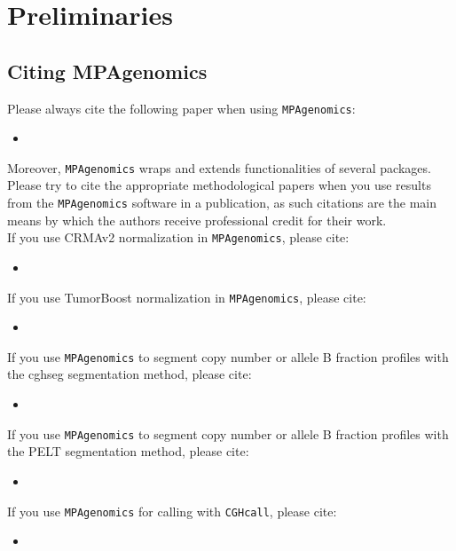 \documentclass[a4paper,10pt]{article}
\begin{document}
\section{Preliminaries}

	\subsection{Citing MPAgenomics}
  
  Please always cite the following paper when using \texttt{MPAgenomics}:
    \begin{itemize}
      \item {}
    \end{itemize}
    
Moreover, \texttt{MPAgenomics} wraps and extends functionalities of several packages. Please try to cite the appropriate methodological papers when you use results from the \texttt{MPAgenomics} software in a publication, as such citations are the main means by which the authors receive professional credit for their work.\\
    
    If you use CRMAv2 normalization in \texttt{MPAgenomics}, please cite:
    \begin{itemize}
      \item {}
    \end{itemize}
    
    If you use TumorBoost normalization in \texttt{MPAgenomics}, please cite:
    \begin{itemize}
      \item {}
    \end{itemize}
    
    If you use \texttt{MPAgenomics} to segment copy number or allele B fraction profiles with the cghseg segmentation method, please cite:
    \begin{itemize}
      \item {}
    \end{itemize}
    
    If you use \texttt{MPAgenomics} to segment copy number or allele B fraction profiles with the PELT segmentation method, please cite:
    \begin{itemize}
      \item {}
    \end{itemize}
   
    If you use \texttt{MPAgenomics} for calling with \texttt{CGHcall}, please cite:
    \begin{itemize}
      \item {}
    \end{itemize}
    
\end{document}
